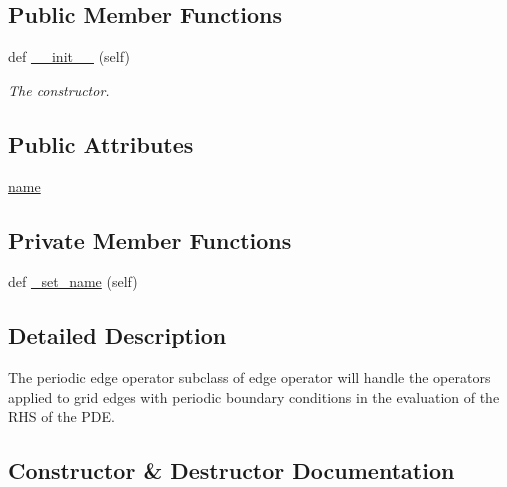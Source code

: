 \subsection*{Public Member Functions}
\begin{DoxyCompactItemize}
\item 
def \hyperlink{classMain__PDE__Repo_1_1src_1_1periodic__edge__ops_1_1PeriodicEdgeOps_a53de9ebf1511a71d9c395e89af86c301}{\+\_\+\+\_\+init\+\_\+\+\_\+} (self)
\begin{DoxyCompactList}\small\item\em The constructor. \end{DoxyCompactList}\end{DoxyCompactItemize}
\subsection*{Public Attributes}
\begin{DoxyCompactItemize}
\item 
\hyperlink{classMain__PDE__Repo_1_1src_1_1periodic__edge__ops_1_1PeriodicEdgeOps_a1ae9e7005e5213be99bf207e3cd533ef}{name}
\end{DoxyCompactItemize}
\subsection*{Private Member Functions}
\begin{DoxyCompactItemize}
\item 
def \hyperlink{classMain__PDE__Repo_1_1src_1_1periodic__edge__ops_1_1PeriodicEdgeOps_a85e9e091c9c3d4e027ff4d3a3acb368d}{\+\_\+set\+\_\+name} (self)
\end{DoxyCompactItemize}


\subsection{Detailed Description}
The periodic edge operator subclass of edge operator will handle the operators applied to grid edges with periodic boundary conditions in the evaluation of the R\+HS of the P\+DE. 



\subsection{Constructor \& Destructor Documentation}
\mbox{\label{classMain__PDE__Repo_1_1src_1_1periodic__edge__ops_1_1PeriodicEdgeOps_a53de9ebf1511a71d9c395e89af86c301}} 
